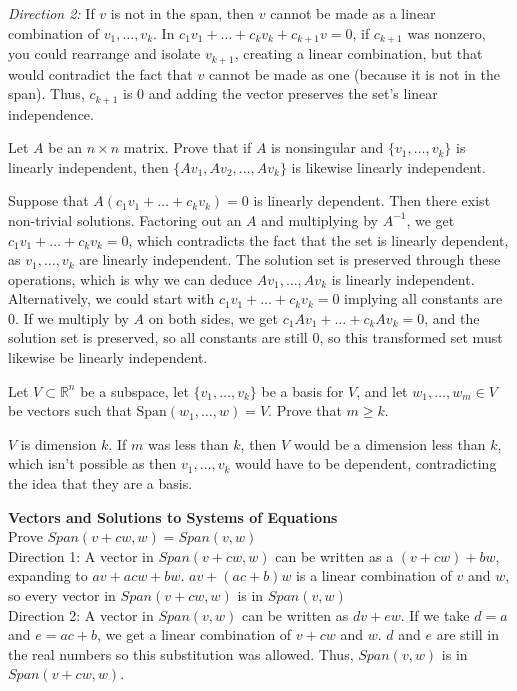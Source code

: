 \documentclass[12pt]{article}
\begin{document}
\textit{Direction 2:} If \( v \) is not in the span, then \( v \) cannot be made as a linear combination of \( v_1, \ldots, v_k \). In \( c_1v_1 + \ldots + c_kv_k + c_{k+1}v = 0 \), if \( c_{k+1} \) was nonzero, you could rearrange and isolate \( v_{k+1} \), creating a linear combination, but that would contradict the fact that \( v \) cannot be made as one (because it is not in the span). Thus, \( c_{k+1} \) is 0 and adding the vector preserves the set’s linear independence.

Let \( A \) be an \( n \times n \) matrix. Prove that if \( A \) is nonsingular and \( \{v_1, \ldots, v_k\} \) is linearly independent, then \( \{Av_1, Av_2, \ldots, Av_k\} \) is likewise linearly independent.

Suppose that \( A(c_1v_1 + \ldots + c_kv_k) = 0 \) is linearly dependent. Then there exist non-trivial solutions. Factoring out an \( A \) and multiplying by \( A^{-1} \), we get \( c_1v_1 + \ldots + c_kv_k = 0 \), which contradicts the fact that the set is linearly dependent, as \( v_1, \ldots, v_k \) are linearly independent. The solution set is preserved through these operations, which is why we can deduce \( Av_1, \ldots, Av_k \) is linearly independent. Alternatively, we could start with \( c_1v_1 + \ldots + c_kv_k = 0 \) implying all constants are 0. If we multiply by \( A \) on both sides, we get \( c_1Av_1 + \ldots + c_kAv_k = 0 \), and the solution set is preserved, so all constants are still 0, so this transformed set must likewise be linearly independent.

Let \( V \subset \mathbb{R}^n \) be a subspace, let \( \{v_1, \ldots, v_k\} \) be a basis for \( V \), and let \( w_1, \ldots, w_m \in V \) be vectors such that \( \text{Span} (w_1, \ldots, w) = V \). Prove that \( m \geq k \).

\( V \) is dimension \( k \). If \( m \) was less than \( k \), then \( V \) would be a dimension less than \( k \), which isn't possible as then \( v_1, \ldots, v_k \) would have to be dependent, contradicting the idea that they are a basis.






\textbf{Vectors and Solutions to Systems of Equations}\\
 
 Prove $Span(v+cw,w) = Span(v,w)$\\
 Direction 1: A vector in $Span(v+cw, w)$ can be written as a $(v+cw) + bw$, expanding to $av+acw+bw$. $av + (ac+b)w$ is a linear combination of $v$ and $w$, so every vector in $Span(v+cw,w)$ is in $Span(v,w)$\\
Direction 2: A vector in $Span(v,w)$ can be written as $dv+ew$. If we take $d=a$ and $e=ac+b$, we get a linear combination of $v+cw$ and $w$. $d$ and $e$ are still in the real numbers so this substitution was allowed. Thus, $Span(v,w)$ is in $Span(v+cw,w)$.\\
\end{document}
